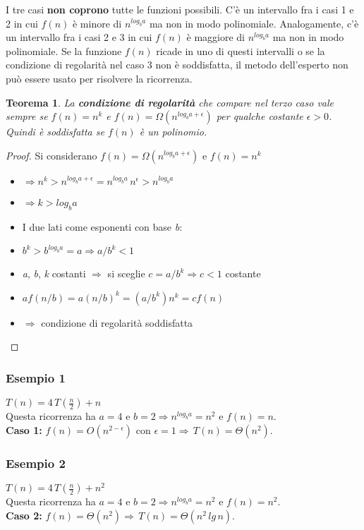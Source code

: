 \documentclass[10pt, a4paper]{report}
\newtheorem{theorem}{Teorema}[chapter]
\begin{document}
I tre casi \textbf{non coprono} tutte le funzioni possibili. C'è un intervallo fra i casi 1 e 2 in cui $f(n)$ è minore di $n^{log_{b}{a}}$ ma non in modo polinomiale. Analogamente, c'è un intervallo fra i casi 2 e 3 in cui $f(n)$ è maggiore di $n^{log_{b}{a}}$ ma non in modo polinomiale. Se la funzione $f(n)$ ricade in uno di questi intervalli o se la condizione di regolarità nel caso 3 non è soddisfatta, il metodo dell'esperto non può essere usato per risolvere la ricorrenza.
\begin{theorem}
La \textbf{condizione di regolarità} che compare nel terzo caso vale sempre se $f(n) = n^k$ e $f(n) = \Omega(n^{log_{b}{a} + \epsilon})$ per qualche costante $\epsilon > 0$. Quindi è soddisfatta se $f(n)$ è un polinomio.
\end{theorem}
\begin{proof}
Si considerano $f(n) = \Omega(n^{log_{b}{a} + \epsilon})$ e $f(n) = n^k$
\begin{itemize}
\item[]$\Rightarrow n^k > n^{log_{b}{a} + \epsilon} = n^{log_{b}{a}} \,n^\epsilon > n^{log_{b}{a}}$
\item[]$\Rightarrow k > log_{b}{a}$
\item I due lati come esponenti con base \textit{b}:
\item[]$b^k > b^{log_{b}{a}} = a \Rightarrow a/b^k < 1$
\item \textit{a}, \textit{b}, \textit{k} costanti $\Rightarrow$ si sceglie $c = a/b^k \Rightarrow c < 1$ costante
\item$af(n/b) = a(n/b)^k = (a/b^k)n^k = cf(n)$
\item[]$\Rightarrow$ condizione di regolarità soddisfatta
\end{itemize}
\end{proof}
\subsubsection{Esempio 1}
$T(n) = 4\,T(\frac{n}{2}) + n$\\
Questa ricorrenza ha $a = 4$ e $b = 2 \Rightarrow n^{log_{b}{a}} = n^2$ e $f(n) = n$.\\\textbf{Caso 1:} $f(n) = O(n^{2 - \epsilon})$ con $\epsilon = 1 \Rightarrow \,T(n) = \Theta(n^2)$.
\subsubsection{Esempio 2}
$T(n) = 4\,T(\frac{n}{2}) + n^2$\\
Questa ricorrenza ha $a = 4$ e $b = 2 \Rightarrow n^{log_{b}{a}} = n^2$ e $f(n) = n^2$.\\\textbf{Caso 2:} $f(n) = \Theta(n^2) \Rightarrow \,T(n) = \Theta(n^2\,lg\,n)$.
\end{document}
